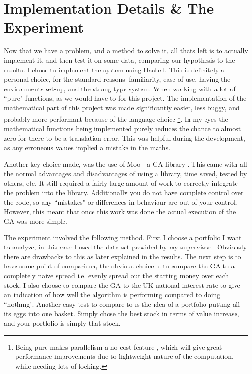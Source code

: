 \documentclass[11pt]{article}
\begin{document}
\section{Implementation Details \& The Experiment}

    Now that we have a problem, and a method to solve it, all thats left is to actually
    implement it, and then test it on some data, comparing our hypothesis to the results.
    I chose to implement the system using Haskell. This is definitely a personal
    choice, for the standard reasons: familiarity, ease of use, having the environments
    set-up, and the strong type system. When working with a lot of ``pure"
    functions, as we would have to for this project. The implementation 
    of the mathematical part of this project was made significantly
    easier, less buggy, and probably more performant because of the language choice
    \footnote{Being pure makes parallelism a no cost feature \cite{HarrisMarlowJones, Chakravarty},
    which will give great performance improvements due to lightweight nature of the 
    computation, while needing lots of locking. }.
    In my eyes the mathematical functions
    being implemented purely reduces the chance to almost zero for there to be a translation
    error. This was helpful during the development, as any erroneous values implied a mistake
    in the maths.

    Another key choice made, was the use of Moo - a GA library \cite{Moo}. This came with all
    the normal advantages and disadvantages of using a library, time saved, tested by others, etc.
    It still required a fairly large amount of work to correctly integrate the
    problem into the library. Additionally you do not have complete control over the code,
    so any ``mistakes" or differences in behaviour are out of your control. However,
    this meant that once this work was done the actual execution of the GA was more simple.

    The experiment involved the following method. First I choose a portfolio I want to
    analyze, in this case I used the data set provided by my supervisor \cite{Dataset}.
    Obviously there are drawbacks to this as later explained in the results. The next step is
    to have some point of comparison, the obvious choice is to compare the GA to
    a completely naive spread i.e. evenly spread out the starting money over each stock.
    I also choose to compare the GA to the UK national interest rate \cite{BankOfE} to give an
    indication of how well the algorithm is performing compared to doing ``nothing". Another
    easy test to compare to is the idea of a portfolio putting all its eggs into one basket.
    Simply chose the best stock in terms of value increase, and your portfolio is simply that
    stock.
\end{document}
